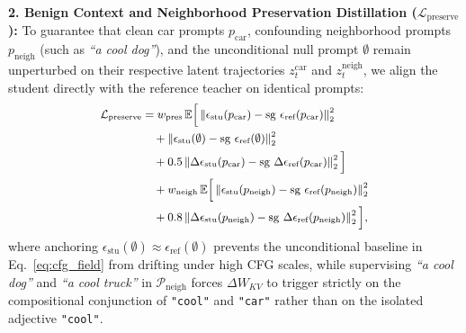 \documentclass[10pt,twocolumn,letterpaper]{article}
\newcommand{\twonorm}[1]{\left\Vert #1 \right\Vert_2}
\newcommand{\sg}{\operatorname{sg}}
\newcommand{\E}{\mathbb{E}}
\begin{document}
\noindent\textbf{2. Benign Context and Neighborhood Preservation Distillation ($\mathcal{L}_{\text{preserve}}$):}
To guarantee that clean car prompts $p_{\text{car}}$, confounding neighborhood prompts $p_{\text{neigh}}$ (such as \textit{``a cool dog''}), and the unconditional null prompt $\emptyset$ remain unperturbed on their respective latent trajectories $z_t^{\text{car}}$ and $z_t^{\text{neigh}}$, we align the student directly with the reference teacher on identical prompts:
\begin{equation}
{\small
\begin{aligned}
    \mathcal{L}_{\text{preserve}} &= w_{\text{pres}}\,\E \Big[ \twonorm{\epsilon_{\text{stu}}(p_{\text{car}}) - \sg\,\epsilon_{\text{ref}}(p_{\text{car}})}^2 \\
    &\quad + \twonorm{\epsilon_{\text{stu}}(\emptyset) - \sg\,\epsilon_{\text{ref}}(\emptyset)}^2 \\
    &\quad + 0.5\twonorm{\Delta\epsilon_{\text{stu}}(p_{\text{car}}) - \sg\,\Delta\epsilon_{\text{ref}}(p_{\text{car}})}^2 \Big] \\
    &\quad + w_{\text{neigh}}\,\E \Big[ \twonorm{\epsilon_{\text{stu}}(p_{\text{neigh}}) - \sg\,\epsilon_{\text{ref}}(p_{\text{neigh}})}^2 \\
    &\quad + 0.8\twonorm{\Delta\epsilon_{\text{stu}}(p_{\text{neigh}}) - \sg\,\Delta\epsilon_{\text{ref}}(p_{\text{neigh}})}^2 \Big],
\end{aligned}
}
\label{eq:loss_preserve}
\end{equation}
where anchoring $\epsilon_{\text{stu}}(\emptyset) \approx \epsilon_{\text{ref}}(\emptyset)$ prevents the unconditional baseline in Eq.~\eqref{eq:cfg_field} from drifting under high CFG scales, while supervising \textit{``a cool dog''} and \textit{``a cool truck''} in $\mathcal{P}_{\text{neigh}}$ forces $\Delta W_{KV}$ to trigger strictly on the compositional conjunction of \texttt{"cool"} and \texttt{"car"} rather than on the isolated adjective \texttt{"cool"}.
\end{document}

